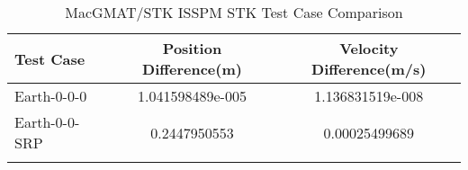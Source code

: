 \begin{table}[htbp!]
\centering
\caption{ MacGMAT/STK ISSPM STK Test Case Comparison}
      \begin{tabular}{lcc}
      \hline\hline
          Test Case & Position Difference(m) & Velocity Difference(m/s) \\
         \hline
         Earth-0-0-0 & 1.041598489e-005 & 1.136831519e-008 \\
         Earth-0-0-SRP & 0.2447950553 & 0.00025499689 \\
      \hline\hline
      \label{Table: ISSPM STK Table} 
\end{tabular}
\end{table}
